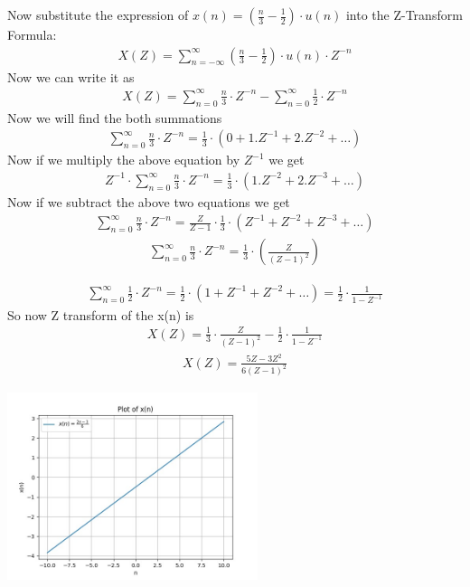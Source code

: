 \documentclass[journal,12pt,twocolumn]{IEEEtran}
\theoremstyle{remark}
\begin{document}
\bigskip
Now substitute the expression of 
$x(n) = \left(\frac{n}{3} - \frac{1}{2} \right)\cdot u(n)$ into the Z-Transform Formula:
\begin{align} X(Z) = \sum_{n = -\infty}^{\infty} (\frac{n}{3} - \frac{1}{2} ) \cdot u(n)  \cdot Z^{-n} \end{align}
\bigskip
Now we can write it as 
\begin{align} X(Z) = \sum_{n=0}^{\infty} \frac{n}{3} \cdot Z^{-n} - \sum_{n=0}^{\infty} \frac{1}{2} \cdot Z^{-n} \end{align}
\bigskip
Now we will find the both summations 
\begin{align} \sum_{n=0}^{\infty} \frac{n}{3} \cdot Z^{-n} = \frac{1}{3} \cdot (0 + 1.Z^{-1} + 2.Z^{-2} + \ldots) \end{align}
\bigskip
Now if we multiply the above equation by $Z^{-1}$ we get 
\begin{align} Z^{-1} \cdot \sum_{n=0}^{\infty} \frac{n}{3} \cdot Z^{-n} =\frac{1}{3} \cdot (1.Z^{-2} + 2.Z^{-3} + \ldots ) \end{align}
\bigskip
Now if we subtract the above two equations we get 
\begin{align} \sum_{n=0}^{\infty} \frac{n}{3} \cdot Z^{-n} = \frac{Z}{Z-1} \cdot \frac{1}{3} \cdot (Z^{-1} + Z^{-2} + Z^{-3} + \ldots) \end{align}
\begin{align} \sum_{n=0}^{\infty} \frac{n}{3} \cdot Z^{-n} = \frac{1}{3} \cdot \left(\frac{Z}{(Z-1)^{2}}\right) \end{align}

\begin{align} \sum_{n=0}^{\infty} \frac{1}{2} \cdot Z^{-n} = \frac{1}{2} \cdot (1+Z^{-1} + Z^{-2} + \ldots) = \frac{1}{2} \cdot \frac{1}{1- Z^{-1}} \end{align}
\newpage
So now Z transform of the x(n) is 
\begin{align} X(Z) = \frac{1}{3} \cdot \frac{Z}{(Z-1)^{2}} - \frac{1}{2} \cdot \frac{1}{1-Z^{-1}} \end{align}
\begin{align} X(Z) = {\frac{5Z-3 Z^{2}}{6(Z-1)^{2}}} \end{align}

\includegraphics[width=0.55\textwidth]{figs/graphgvv1.jpg}
\end{document}
